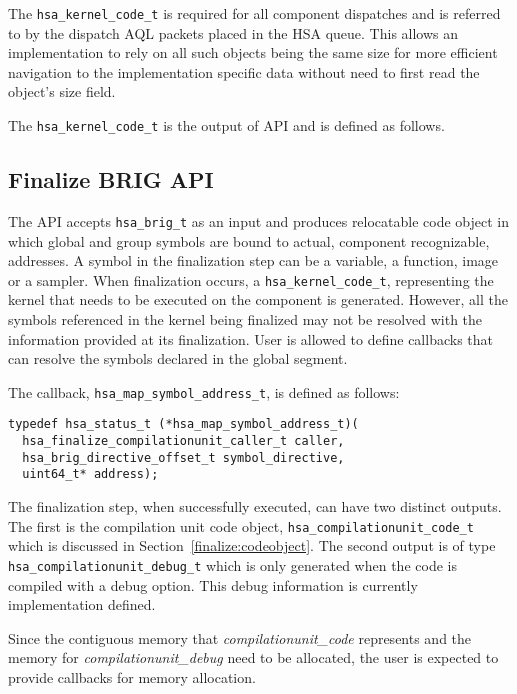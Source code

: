 The \texttt{hsa\_kernel\_code\_t} is required for all component
dispatches and is referred to by the dispatch AQL packets placed in
the HSA queue. This allows an implementation to rely on all such
objects being the same size for more efficient navigation to the
implementation specific data without need to first read the object's
size field.

The \texttt{hsa\_kernel\_code\_t} is the output of
 API and is defined as follows.



\subsection{Finalize BRIG API}
The  API accepts \texttt{hsa\_brig\_t} as
an input and produces relocatable code object in which global and
group symbols are bound to actual, component recognizable,
addresses.  A symbol in the finalization step can be a variable, a
function, image or a sampler. When finalization occurs, a
\texttt{hsa\_kernel\_code\_t}, representing the kernel that needs to
be executed on the component is generated.  However, all the symbols
referenced in the kernel being finalized may not be resolved with
the information provided at its finalization. User is allowed to
define callbacks that can resolve the symbols declared in the global
segment.

The callback, \texttt{hsa\_map\_symbol\_address\_t}, is defined as
follows:
\begin{lstlisting}
typedef hsa_status_t (*hsa_map_symbol_address_t)(
  hsa_finalize_compilationunit_caller_t caller,
  hsa_brig_directive_offset_t symbol_directive,
  uint64_t* address);
\end{lstlisting}

The finalization step, when successfully executed, can have two
distinct outputs. The first is the compilation unit code object,
\texttt{hsa\_compilationunit\_code\_t} which is discussed in
Section~\ref{finalize:codeobject}. The second output is of type
\texttt{hsa\_compilationunit\_debug\_t} which is only generated when
the code is compiled with a debug option. This debug information is
currently implementation defined.

Since the contiguous memory that {\itshape
compilationunit\_code} represents and the memory for {\itshape
compilationunit\_debug} need to be allocated, the user is expected
to provide callbacks for memory allocation.

